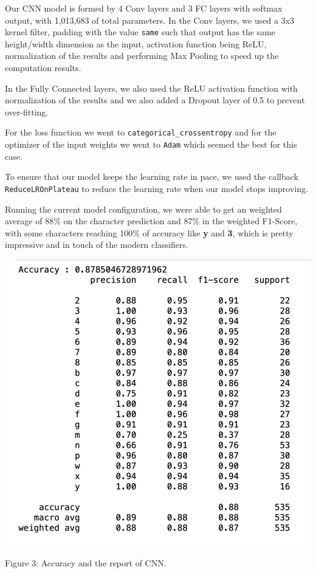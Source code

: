 \documentclass[conference]{IEEEtran}
\begin{document}
Our CNN model is formed by 4 Conv layers and 3 FC layers with softmax output, with 1,013,683 of total parameters. In the Conv layers, we used a 3x3 kernel filter, padding with the value \texttt{same} such that output has the same height/width dimension as the input, activation function being ReLU, normalization of the results and performing Max Pooling to speed up the computation results. 
\par In the Fully Connected layers, we also used the ReLU activation function with normalization of the results and we also added a Dropout layer of 0.5 to prevent over-fitting.
\par For the loss function we went to  \texttt{categorical\_crossentropy} and for the optimizer of the input weights we went to \texttt{Adam} which seemed the best for this case.  
\par To ensure that our model keeps the learning rate in pace, we used the callback \texttt{ReduceLROnPlateau} to reduce the learning rate when our model stops improving.
\par Running the current model configuration, we were able to get an weighted average of 88\% on the character prediction and 87\% in the weighted F1-Score, with some characters reaching 100\% of accuracy like \textbf{y} and \textbf{3}, which is pretty impressive and in touch of the modern classifiers.
\begin{center}
\includegraphics[scale=0.55]{cnn.png}
\caption{Figure 3: Accuracy and the report of CNN.}
\end{center}
\\ \\ \\
\end{document}
